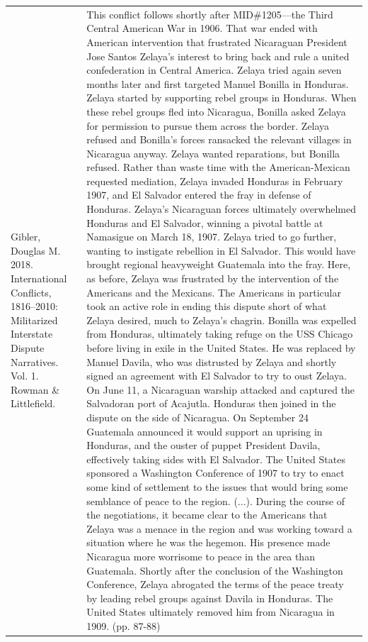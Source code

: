 {\begin{longtable}{p{}p{}}
Gibler, Douglas M. 2018. International Conflicts, 1816–2010: Militarized Interstate Dispute Narratives. Vol. 1. Rowman \& Littlefield. & This conflict follows shortly after MID\#1205—the Third Central American War in 1906. That war ended with American intervention that frustrated Nicaraguan President Jose Santos Zelaya's interest to bring back and rule a united confederation in Central America. Zelaya tried again seven months later and first targeted Manuel Bonilla in Honduras. Zelaya started by supporting rebel groups in Honduras. When these rebel groups fled into Nicaragua, Bonilla asked Zelaya for permission to pursue them across the border. Zelaya refused and Bonilla's forces ransacked the relevant villages in Nicaragua anyway. Zelaya wanted reparations, but Bonilla refused. Rather than waste time with the American-Mexican requested mediation, Zelaya invaded Honduras in February 1907, and El Salvador entered the fray in defense of Honduras. Zelaya's Nicaraguan forces ultimately overwhelmed Honduras and El Salvador, winning a pivotal battle at Namasigue on March 18, 1907. Zelaya tried to go further, wanting to instigate rebellion in El Salvador. This would have brought regional heavyweight Guatemala into the fray. Here, as before, Zelaya was frustrated by the intervention of the Americans and the Mexicans. The Americans in particular took an active role in ending this dispute short of what Zelaya desired, much to Zelaya's chagrin. Bonilla was expelled from Honduras, ultimately taking refuge on the USS Chicago before living in exile in the United States. He was replaced by Manuel Davila, who was distrusted by Zelaya and shortly signed an agreement with El Salvador to try to oust Zelaya. On June 11, a Nicaraguan warship attacked and captured the Salvadoran port of Acajutla. Honduras then joined in the dispute on the side of Nicaragua. On September 24 Guatemala announced it would support an uprising in Honduras, and the ouster of puppet President Davila, effectively taking sides with El Salvador. The United States sponsored a Washington Conference of 1907 to try to enact some kind of settlement to the issues that would bring some semblance of peace to the region. (...). During the course of the negotiations, it became clear to the Americans that Zelaya was a menace in the region and was working toward a situation where he was the hegemon. His presence made Nicaragua more worrisome to peace in the area than Guatemala. Shortly after the conclusion of the Washington Conference, Zelaya abrogated the terms of the peace treaty by leading rebel groups against Davila in Honduras. The United States ultimately removed him from Nicaragua in 1909. (pp. 87-88)

\end{longtable}}
